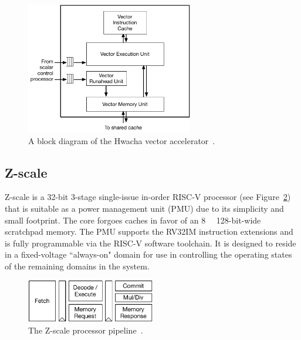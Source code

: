 \documentclass[graybox]{svmult}
\begin{document}
\begin{figure}
  \centering
  \includegraphics[width=0.65\textwidth]{6-raven3-hwacha}
  \caption{A block diagram of the Hwacha vector accelerator~\cite{Zimmer2016}.}
  \label{fig:6-raven3-hwacha}
\end{figure}


\subsection{Z-scale}

Z-scale is a 32-bit 3-stage single-issue in-order RISC-V processor (see Figure~\ref{fig:4-zscale}) that is suitable as a power management unit (PMU) due to its simplicity and small footprint.
The core forgoes caches in favor of an \SI{8}{\kibi\byte} 128-bit-wide scratchpad memory.
The PMU supports the RV32IM instruction extensions and is fully programmable via the RISC-V software toolchain.
It is designed to reside in a fixed-voltage ``always-on" domain for use in controlling the operating states of the remaining domains in the system.

\begin{figure}
  \centering
  \includegraphics[width=0.5\textwidth]{4-zscale}
  \caption{The Z-scale processor pipeline~\cite{Keller2017}.}
  \label{fig:4-zscale}
\end{figure}
\end{document}
